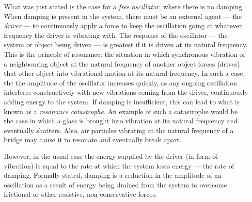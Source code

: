 What was just stated is the case for a \emph{free oscillator}, where there is no damping. When damping is present in the system, there must be an external agent --- the \emph{driver} --- to continuously apply a force to keep the oscillation going at whatever frequency the driver is vibrating with. The response of the oscillator --- the system or object being driven --- is greatest if it is driven at its natural frequency. This is the princple of resonance: the situation in which synchronous vibration of a neighbouring object at the natural frequency of another object forces (drives) that other object into vibrational motion at its natural frequency. In such a case, the the amplitude of the oscillator increases quickly, as any ongoing oscillation interferes constructively with new vibrations coming from the driver, continuously adding energy to the system. If damping is insufficient, this can lead to what is known as a \emph{resonance catastrophe}. An example of such a catastrophe would be the case in which a glass is brought into vibration at its natural frequency and eventually shatters. Also, air particles vibrating at the natural frequency of a bridge may cause it to resonate and eventually break apart. 

However, in the usual case the energy supplied by the driver (in form of vibration) is equal to the rate at which the system loses energy --- the rate of damping. Formally stated, damping is a reduction in the amplitude of an oscillation as a result of energy being drained from the system to overcome frictional or other resistive, non-conservative forces.

